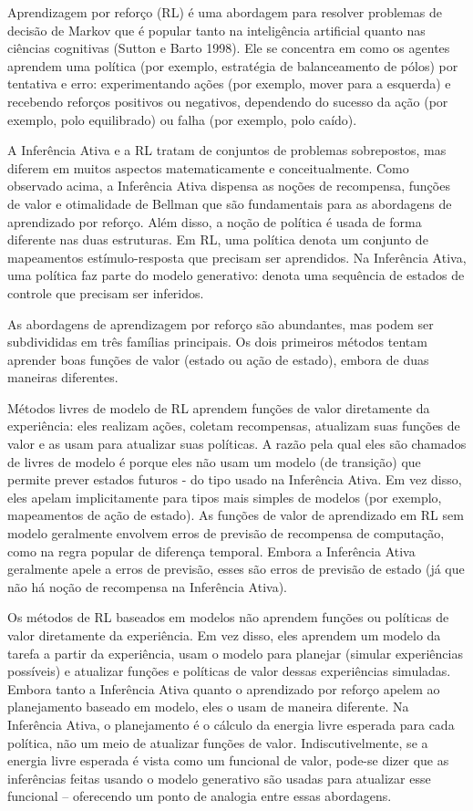 \documentclass[
  12pt,
]{book}
\begin{document}
Aprendizagem por reforço (RL) é uma abordagem para resolver problemas de decisão de Markov que é popular tanto na inteligência artificial quanto nas ciências cognitivas (Sutton e Barto 1998). Ele se concentra em como os agentes aprendem uma política (por exemplo, estratégia de balanceamento de pólos) por tentativa e erro: experimentando ações (por exemplo, mover para a esquerda) e recebendo reforços positivos ou negativos, dependendo do sucesso da ação (por exemplo, polo equilibrado) ou falha (por exemplo, polo caído).

A Inferência Ativa e a RL tratam de conjuntos de problemas sobrepostos, mas diferem em muitos aspectos matematicamente e conceitualmente. Como observado acima, a Inferência Ativa dispensa as noções de recompensa, funções de valor e otimalidade de Bellman que são fundamentais para as abordagens de aprendizado por reforço. Além disso, a noção de política é usada de forma diferente nas duas estruturas. Em RL, uma política denota um conjunto de mapeamentos estímulo-resposta que precisam ser aprendidos. Na Inferência Ativa, uma política faz parte do modelo generativo: denota uma sequência de estados de controle que precisam ser inferidos.

As abordagens de aprendizagem por reforço são abundantes, mas podem ser subdivididas em três famílias principais. Os dois primeiros métodos tentam aprender boas funções de valor (estado ou ação de estado), embora de duas maneiras diferentes.

Métodos livres de modelo de RL aprendem funções de valor diretamente da experiência: eles realizam ações, coletam recompensas, atualizam suas funções de valor e as usam para atualizar suas políticas. A razão pela qual eles são chamados de livres de modelo é porque eles não usam um modelo (de transição) que permite prever estados futuros - do tipo usado na Inferência Ativa. Em vez disso, eles apelam implicitamente para tipos mais simples de modelos (por exemplo, mapeamentos de ação de estado). As funções de valor de aprendizado em RL sem modelo geralmente envolvem erros de previsão de recompensa de computação, como na regra popular de diferença temporal. Embora a Inferência Ativa geralmente apele a erros de previsão, esses são erros de previsão de estado (já que não há noção de recompensa na Inferência Ativa).

Os métodos de RL baseados em modelos não aprendem funções ou políticas de valor diretamente da experiência. Em vez disso, eles aprendem um modelo da tarefa a partir da experiência, usam o modelo para planejar (simular experiências possíveis) e atualizar funções e políticas de valor dessas experiências simuladas. Embora tanto a Inferência Ativa quanto o aprendizado por reforço apelem ao planejamento baseado em modelo, eles o usam de maneira diferente. Na Inferência Ativa, o planejamento é o cálculo da energia livre esperada para cada política, não um meio de atualizar funções de valor. Indiscutivelmente, se a energia livre esperada é vista como um funcional de valor, pode-se dizer que as inferências feitas usando o modelo generativo são usadas para atualizar esse funcional -- oferecendo um ponto de analogia entre essas abordagens.
\end{document}

